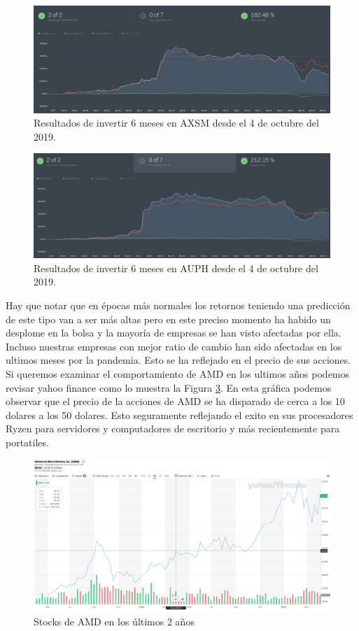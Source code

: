 \documentclass[10pt,a4paper,twocolumn]{article}
\begin{document}
	\begin{figure}
		\centering
		\includegraphics[width=1\linewidth]{AXSM}
		\caption{Resultados de invertir 6 meses en AXSM desde el 4 de octubre del 2019.}
		\label{fig:axsm}
	\end{figure}
	\begin{figure}
		\centering
		\includegraphics[width=1\linewidth]{auph}
		\caption{Resultados de invertir 6 meses en AUPH desde el 4 de octubre del 2019.}
		\label{fig:auph}
	\end{figure}
	Hay que notar que en épocas más normales los retornos teniendo una predicción de este tipo van a ser más altas pero en este preciso momento ha habido un desplome en la bolsa y la mayoría de empresas se han visto afectadas por ella. Incluso nuestras empresas con mejor ratio de cambio han sido afectadas en los ultimos meses por la pandemia. Esto se ha reflejado en el precio de sus acciones. \\

Si queremos examinar el comportamiento de AMD en los ultimos años podemos revisar yahoo finance como lo muestra la Figura \ref{fig:amdstock}. En esta gráfica podemos observar que el precio de la acciones de AMD se ha disparado de cerca a los 10 dolares a los 50 dolares. Esto seguramente reflejando el exito en sus procesadores Ryzen para servidores y computadores de escritorio y más recientemente para portatiles. \\


\begin{figure}
	\centering
	\includegraphics[width=1\linewidth]{amd_stock}
	\caption{Stocks de AMD en los últimos 2 años}
	\label{fig:amdstock}
\end{figure}

		
	
\end{document}
